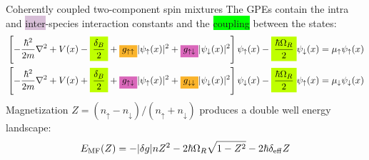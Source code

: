 \documentclass[aspectratio=169]{beamer}
\begin{document}

\begin{frame}{Coherently coupled two-component spin mixtures}
  The GPEs contain the \colorbox{Dandelion}{intra} and \colorbox{Thistle}{inter}-species interaction constants and the \colorbox{lime}{coupling} between the states:
  \begin{equation*}
    \begin{aligned}
        &\left[ -\frac{\hbar^2}{2m}\nabla^2 + V(x) - \colorbox{lime}{$\dfrac{\delta_B}{2}$} + \colorbox{Dandelion}{$g_{\uparrow\uparrow}$}|\psi_\uparrow(x)|^2 + \colorbox{Thistle}{$g_{\uparrow\downarrow}$}|\psi_\downarrow(x)|^2
        \right] \psi_\uparrow(x) - \colorbox{lime}{$\dfrac{\hbar\Omega_R}{2}$}\psi_\downarrow(x) = \mu_\uparrow \psi_\uparrow(x) \\
        &\left[ -\frac{\hbar^2}{2m}\nabla^2 + V(x) + \colorbox{lime}{$\dfrac{\delta_B}{2}$} + \colorbox{Thistle}{$g_{\uparrow\downarrow}$}|\psi_\uparrow(x)|^2 + \colorbox{Dandelion}{$g_{\downarrow\downarrow}$}|\psi_\downarrow(x)|^2
        \right] \psi_\downarrow(x) - \colorbox{lime}{$\dfrac{\hbar\Omega_R}{2}$}\psi_\uparrow(x) = \mu_\downarrow \psi_\downarrow(x)
    \end{aligned}
  \end{equation*}
  \pause
  Magnetization $Z = (n_\uparrow-n_\downarrow)/(n_\uparrow+n_\downarrow)$ produces a double well energy landscape:
  \begin{equation*}
      E_{\rm MF}(Z) = -|\delta g|n Z^2 - 2\hbar\Omega_R \sqrt{1-Z^2} - 2\hbar\delta_{\rm eff} Z
      \label{eq:E_MF}
  \end{equation*}
\end{frame}
\end{document}
